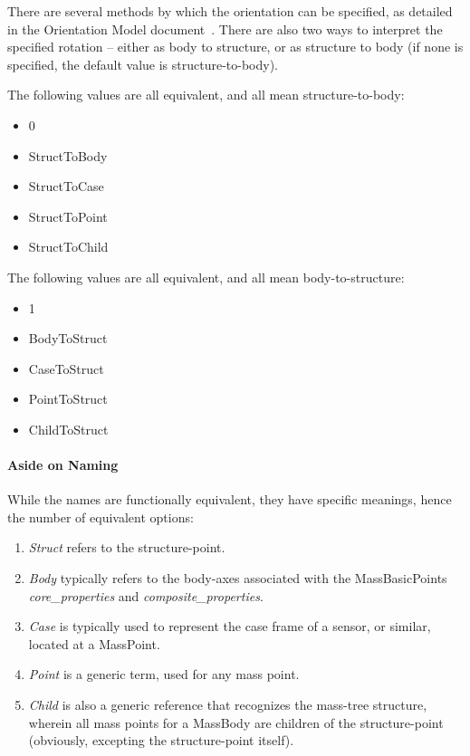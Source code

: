 There are several methods by which the orientation can be specified, as
detailed in the Orientation Model document~\cite{dynenv:ORIENTATION}.  There
are also two ways to interpret the specified rotation -- either as body to
structure, or as structure to body (if none is specified, the default value is
structure-to-body).

The following values are all equivalent, and all mean structure-to-body:
\begin{itemize}
 \item 0
 \item StructToBody
 \item StructToCase
 \item StructToPoint
 \item StructToChild
\end{itemize}

The following values are all equivalent, and all mean body-to-structure:
\begin{itemize}
 \item 1
 \item BodyToStruct
 \item CaseToStruct
 \item PointToStruct
 \item ChildToStruct
\end{itemize}

\paragraph{Aside on Naming}
While the names are functionally equivalent, they have specific meanings,
hence the number of equivalent options:
\begin{enumerate}
\item \textit{Struct} refers to the structure-point.
\item \textit{Body} typically refers to the body-axes associated with the
MassBasicPoints \textit{core\_properties} and \textit{composite\_properties}.
\item \textit{Case} is typically used to represent the case frame of a sensor,
or similar, located at a MassPoint.
\item \textit{Point} is a generic term, used for any mass point.
\item \textit{Child} is also a generic reference that recognizes the mass-tree
structure, wherein all mass points for a MassBody are children of the
structure-point (obviously, excepting the structure-point itself).
\end{enumerate}



